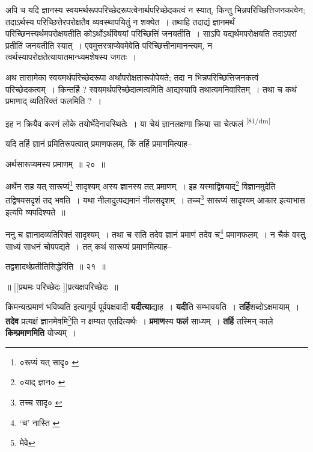 \documentclass[article,12pt,a4paper]{memoir}
\begin{document}
	  \pstart अपि च यदि ज्ञानस्य स्वयमर्थरूपपरिच्छेदरूपत्वेनार्थपरिच्छेदकत्वं न स्यात्, किन्तु भिन्नपरिच्छित्तिजनकत्वेन; तदाऽर्थस्य परिच्छित्तेरपरोक्षतैव व्यवस्थापयितुं न शक्येत । तथाहि तदाद्यं ज्ञानमर्थं परिच्छिनत्त्यर्थमपरोक्षयतीति कोऽर्थोऽर्थविषयां परिच्छित्तिं जनयतीति । साऽपि यद्यर्थमपरोक्षयति तदाऽपरां प्रतीतिं जनयतीति स्यात् । एवमुत्तरत्राप्येवमेवेति परिच्छित्तीनामानन्त्यम्, न त्वर्थस्यापरोक्षतेत्यायातमान्ध्यमशेषस्य जगतः ।
	\pend
      

	  \pstart अथ तासामेका स्वयमर्थपरिच्छेदरूपा अर्थापरोक्षतारूपोपेयते; तदा न भिन्नपरिच्छित्तिजनकत्वं परिच्छेदकत्वम् । किन्तर्हि ? स्वयमर्थपरिच्छेदात्मत्वमिति आद्यस्यापि तथात्वमनिवारितम् । तथा च कथं प्रमाणाद् व्यतिरिक्तं फलमिति ? ।
	\pend
      

	  \pstart इह न क्रियैव करणं लोके तयोर्भेदेनावस्थितेः । या चेयं ज्ञानलक्षणा क्रिया सा चेत्फलं
	\pend
      \leavevmode\textsuperscript{\rmlatinfont\tiny [81/dm]}

	  \pstart यदि तर्हि ज्ञानं प्रमितिरूपत्वात् प्रमाणफलम्, किं तर्हि प्रमाणमित्याह--
	\pend
       

	  \pstart अर्थसारूप्यमस्य प्रमाणम् ॥ २० ॥
	\pend
       

	  \pstart अर्थेन सह यत् सारूप्यं\footnote{०रूप्यं यत् सादृ० \cite{dp-msB} \cite{dp-msD}} सादृश्यम् अस्य ज्ञानस्य तत् प्रमाणम् । इह यस्माद्विषयाद्\footnote{०याद् ज्ञान० \cite{dp-msA} \cite{dp-msC} \cite{dp-edP} \cite{dp-edH} \cite{dp-edE} \cite{dp-edN}} विज्ञानमुदेति तद्विषयसदृशं तद् भवति । यथा नीलादुत्पद्यमानं नीलसदृशम् । तच्च\footnote{तच्च सादृ० \cite{dp-msA} \cite{dp-edP} \cite{dp-edE}} सारूप्यं सादृश्यम् आकार इत्याभास इत्यपि व्यपदिश्यते ॥
	\pend
       

	  \pstart ननु च ज्ञानादव्यतिरिक्तं सादृश्यम् । तथा च सति तदेव ज्ञानं प्रमाणं तदेव च\footnote{‘च’ नास्ति \cite{dp-msA} \cite{dp-msB} \cite{dp-msC} \cite{dp-edP} \cite{dp-edH} \cite{dp-edE} \cite{dp-edN}} प्रमाणफलम् । न चैकं वस्तु साध्यं साधनं चोपपद्यते । तत् कथं सारूप्यं प्रमाणमित्याह--
	\pend
       

	  \pstart तद्वशादर्थप्रतीतिसिद्धेरिति ॥ २१ ॥
	\pend
       
	    
	    \pstart
	    \begin{center}
	  ॥ [[प्रथमः परिच्छेदः \cite{dp-msB} \cite{dp-msC}]]प्रत्यक्षपरिच्छेदः ॥
	    \end{center}
	    \pend
	  
	  

	  \pstart किमन्यत्प्रमाणं भविष्यति इत्यागूर्य पूर्वपक्षवादी \textbf{यदीत्या}द्याह । \textbf{यदी}ति सम्भावयति । \textbf{तर्हि}शब्दोऽक्षमायाम् । \textbf{तदेव} प्रत्यक्षं ज्ञानमेवमि\footnote{मेवे}ति न क्षम्यत एतदित्यर्थः । \textbf{प्रमाण}स्य \textbf{फलं} साध्यम् । \textbf{तर्हि} तस्मिन् काले \textbf{किम्प्रमाणमिति} योज्यम् ।
	\pend
      
\end{document}
